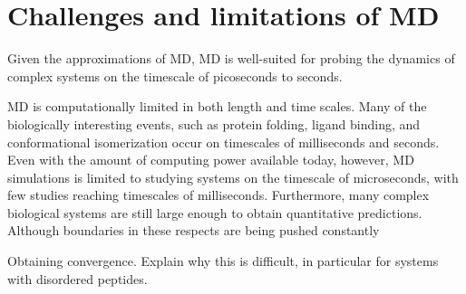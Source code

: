 


\section{Challenges and limitations of MD}

Given the approximations of MD, MD is well-suited for probing the dynamics of complex systems on the timescale of picoseconds to seconds.

MD is computationally limited in both length and time scales. Many of the biologically interesting events, such as protein folding, ligand binding, and conformational isomerization occur on timescales of milliseconds and seconds.  Even with the amount of computing power available today, however, MD simulations is limited to studying systems on the timescale of microseconds, with few studies reaching timescales of milliseconds. Furthermore, many complex biological systems are still large enough to obtain quantitative predictions. Although boundaries in these respects are being pushed constantly\cite{DE Shaw, Chris Neale, Sarah}

Obtaining convergence. Explain why this is difficult, in particular for systems with disordered peptides.			

